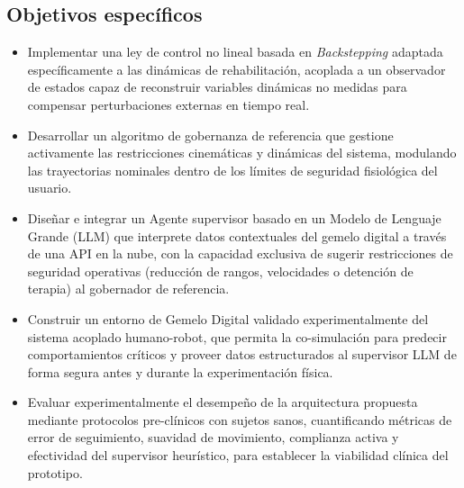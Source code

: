 \documentclass[a4paper,12pt]{article}
\begin{document}
\subsection{Objetivos específicos}

\begin{itemize}

    \item Implementar una ley de control no lineal basada en \textit{Backstepping} adaptada específicamente a las dinámicas de rehabilitación, acoplada a un observador de estados capaz de reconstruir variables dinámicas no medidas para compensar perturbaciones externas en tiempo real.

    \item Desarrollar un algoritmo de gobernanza de referencia que gestione activamente las restricciones cinemáticas y dinámicas del sistema, modulando las trayectorias nominales dentro de los límites de seguridad fisiológica del usuario.

    \item Diseñar e integrar un Agente supervisor basado en un Modelo de Lenguaje Grande (LLM) que interprete datos contextuales del gemelo digital a través de una API en la nube, con la capacidad exclusiva de sugerir restricciones de seguridad operativas (reducción de rangos, velocidades o detención de terapia) al gobernador de referencia.

    \item Construir un entorno de Gemelo Digital validado experimentalmente del sistema acoplado humano-robot, que permita la co-simulación para predecir comportamientos críticos y proveer datos estructurados al supervisor LLM de forma segura antes y durante la experimentación física.

    \item Evaluar experimentalmente el desempeño de la arquitectura propuesta mediante protocolos pre-clínicos con sujetos sanos, cuantificando métricas de error de seguimiento, suavidad de movimiento, complianza activa y efectividad del supervisor heurístico, para establecer la viabilidad clínica del prototipo.

\end{itemize}


\newpage
\end{document}

